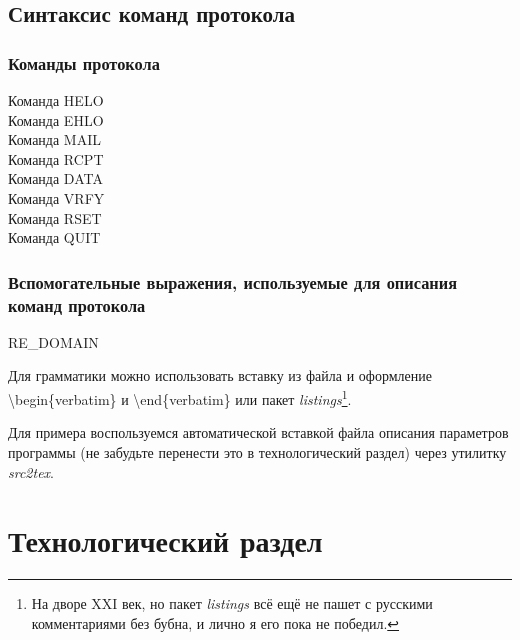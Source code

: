 \documentclass[a4paper,12pt]{report}
\begin{document}
\section{Синтаксис команд протокола}

\subsection{Команды протокола}
\begin{description}
\item[Команда HELO]

\item[Команда EHLO]

\item[Команда MAIL]

\item[Команда RCPT]

\item[Команда DATA]

\item[Команда VRFY]

\item[Команда RSET]

\item[Команда QUIT]

\end{description}

\subsection{Вспомогательные выражения, используемые для описания команд протокола}
\begin{description}
\item[RE\_DOMAIN]

\end{description}


Для грамматики можно использовать вставку из файла и оформление \textbackslash{}begin\{verbatim\} и \textbackslash{}end\{verbatim\} или пакет \textit{listings}\footnote{На дворе XXI век, но пакет \textit{listings} всё ещё не пашет с русскими комментариями без бубна, и лично я его пока не победил.}.

Для примера воспользуемся автоматической вставкой файла описания параметров программы (не забудьте перенести это в технологический раздел) через утилитку \textit{src2tex}.


% 

\chapter{Технологический раздел}
\end{document}
